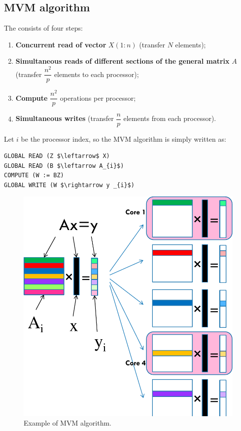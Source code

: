 \subsection{MVM algorithm}

The  consists of four steps:
\begin{enumerate}
    \item \textbf{Concurrent read of vector} $X\left(1 : n\right)$ (transfer $N$ elements);

    \item \textbf{Simultaneous reads of different sections of the general matrix} $A$ (transfer $\dfrac{n^{2}}{p}$ elements to each processor);

    \item \textbf{Compute} $\dfrac{n^{2}}{p}$ operations per processor;

    \item \textbf{Simultaneous writes} (transfer $\dfrac{n}{p}$ elements from each processor).
\end{enumerate}
Let $i$ be the processor index, so the MVM algorithm is simply written as:
\begin{lstlisting}[mathescape=true, caption={Matrix-Vector Multiply (MVM)}]
GLOBAL READ (Z $\leftarrow$ X)
GLOBAL READ (B $\leftarrow A_{i}$)
COMPUTE (W := BZ)
GLOBAL WRITE (W $\rightarrow y _{i}$)
\end{lstlisting}

\highspace
\begin{figure}[!htp]
    \centering
    \includegraphics[width=.7\textwidth]{img/mvm-1.pdf}
    \caption{Example of MVM algorithm.}
\end{figure}

